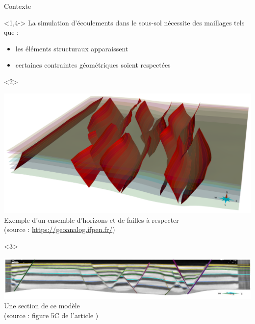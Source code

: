 \documentclass[aspectratio=169, 12pt, a4paper, hyperref={pdfauthor={Alexandre MARIN}, pdfkeywords={IFPEN, Delaunay, Voronoi, mesh generation}, colorlinks=true, linkcolor=purple, urlcolor=blue, citecolor=magenta}]{beamer}
\begin{document}
\begin{Energie}{Contexte}

\begin{visibleenv}<1,4->
La simulation d'écoulements dans le sous-sol nécessite des maillages tels que :
\begin{itemize}
\item<1,4,5,6> les éléments structuraux apparaissent
\item<4-> certaines contraintes géométriques soient respectées
\end{itemize}
\end{visibleenv}

\begin{onlyenv}<2>
\begin{center}\vspace{-1cm}
\includegraphics[scale=0.27]{Analog.png}
\\Exemple d'un ensemble d'horizons et de failles à respecter\\(source : \url{https://geoanalog.ifpen.fr/})
\end{center}
\end{onlyenv}
\begin{onlyenv}<3>
\begin{center}\vspace{-1cm}
\includegraphics[scale=0.5]{crossSectionClyde.jpg}
\\Une section de ce modèle\\(source : figure 5C de l'article \cite{TERTOIS_RM2020})
\end{center}
\end{onlyenv}



\end{Energie}
\end{document}

